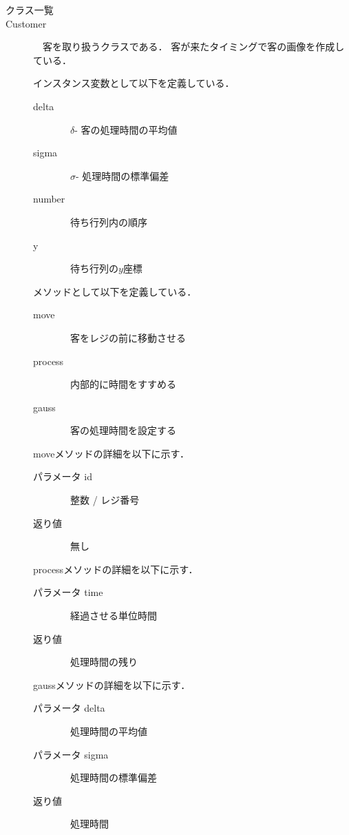 \documentclass[12pt,a4j]{ltjsarticle}
\begin{document}
\begin{description}
\item[クラス一覧]
\item[Customer]　客を取り扱うクラスである．
客が来たタイミングで客の画像を作成している．

インスタンス変数として以下を定義している．
\begin{description}
	\item[delta]　$\delta$- 客の処理時間の平均値
	\item[sigma]　$\sigma$- 処理時間の標準偏差
	\item[number]　待ち行列内の順序
	\item[y]　待ち行列の$y$座標
\end{description}
\vspace{5mm}

メソッドとして以下を定義している．
\begin{description}
	\item[move]　客をレジの前に移動させる
	\item[process]　内部的に時間をすすめる
	\item[gauss]　客の処理時間を設定する
\end{description}
\vspace{5mm}

moveメソッドの詳細を以下に示す．
\begin{description}
	\item[パラメータ id]　整数 / レジ番号
	\item[返り値]　無し
\end{description}
\vspace{5mm}

processメソッドの詳細を以下に示す．
\begin{description}
	\item[パラメータ time]　経過させる単位時間
	\item[返り値]　処理時間の残り
\end{description}
\vspace{5mm}

gaussメソッドの詳細を以下に示す．
\begin{description}
	\item[パラメータ delta]　処理時間の平均値
	\item[パラメータ sigma]　処理時間の標準偏差
	\item[返り値]　処理時間
\end{description}
\vspace{10mm}
\clearpage



\end{description}
\end{document}
